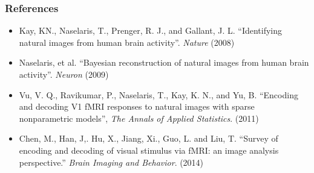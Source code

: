 \documentclass{beamer}
\begin{document}
\begin{frame}
\frametitle{References}
\begin{itemize}
\item Kay, KN., Naselaris, T., Prenger, R. J., and Gallant, J. L.
  ``Identifying natural images from human brain
  activity''. \emph{Nature} (2008)
\item Naselaris, et al. ``Bayesian reconstruction of natural images
  from human brain activity''.  \emph{Neuron} (2009)
\item Vu, V. Q., Ravikumar, P., Naselaris, T., Kay, K. N., and Yu, B.
  ``Encoding and decoding V1 fMRI responses to natural images with
  sparse nonparametric models'', \emph{The Annals of Applied
    Statistics}. (2011)
\item Chen, M., Han, J,. Hu, X., Jiang, Xi., Guo, L. and Liu, T.
  ``Survey of encoding and decoding of visual stimulus via fMRI: an
  image analysis perspective.'' \emph{Brain Imaging and
    Behavior}. (2014)
\end{itemize}
\end{frame}
\end{document}
